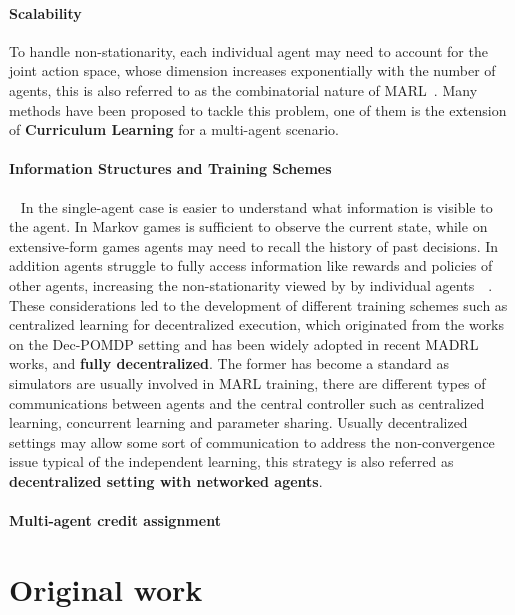 \documentclass[11pt, a4paper, hidelinks]{report}
\begin{document}
\subsubsection{Scalability}
To handle non-stationarity, each individual agent may need to account for the joint action space, whose dimension increases exponentially with the number of agents, this is  also referred to as the combinatorial nature of MARL\@~\citep{zhang2019multiagent}.
Many methods have been proposed to tackle this problem, one of them is the extension of \textbf{Curriculum Learning} for a multi-agent scenario.

\subsubsection{Information Structures and Training Schemes}~\newline
In the single-agent case is easier to understand what information is visible to the agent.
In Markov games is sufficient to observe the current state, while on extensive-form games agents may need to recall the history of past decisions.
In addition agents struggle to fully access information like rewards and policies of other agents, increasing the non-stationarity viewed by by individual agents~\citep{Nguyen_2020}~\citep{zhang2019multiagent}.
These considerations led to the development of different training schemes such as centralized learning for decentralized execution, which originated from the works on the Dec-POMDP setting and has been widely adopted in recent MADRL works, and \textbf{fully decentralized}.
The former has become a standard as simulators are usually involved in MARL training, there are different types of communications between agents and the central controller such as centralized learning, concurrent learning and parameter sharing\citep{Nguyen_2020}.
Usually decentralized settings may allow some sort of communication to address the non-convergence issue typical of the independent learning, this strategy is also referred as \textbf{decentralized setting with networked agents}.

\subsubsection{Multi-agent credit assignment}

\chapter{Original work}\label{ch:original-work}
\end{document}
